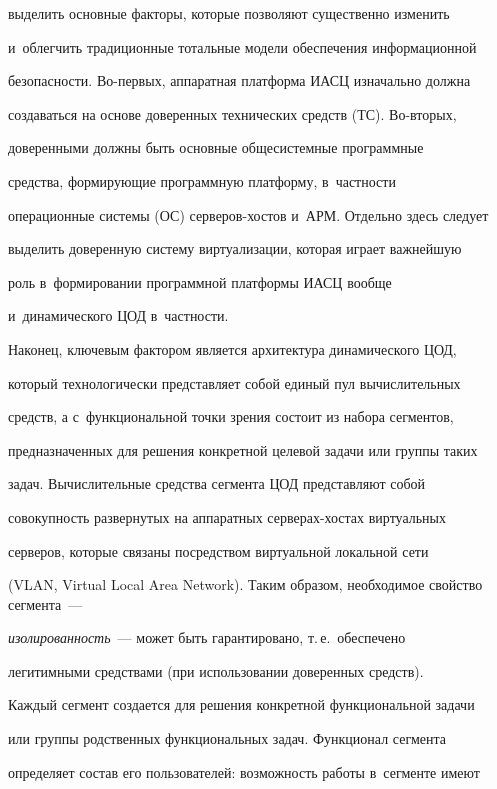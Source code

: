 выделить основные факторы, которые позволяют существенно изменить 


и~облегчить традиционные тотальные модели обеспечения информационной 


безопасности. Во-пер\-вых, аппаратная платформа ИАСЦ изначально должна 


создаваться на основе доверенных технических средств (ТС). Во-вторых, 


доверенными должны быть основные общесистемные программные 


средства, формирующие программную платформу, в~част\-ности 


операционные системы (ОС) сер\-ве\-ров-хос\-тов и~АРМ. Отдельно здесь следует 


выделить доверенную систему виртуализации, которая играет важнейшую 


роль в~формировании программной платформы ИАСЦ вообще 


и~динамического ЦОД в~част\-ности.





Наконец, ключевым фактором является архитектура динамического ЦОД, 


который технологически представляет собой единый пул вычислительных 


средств, а с~функциональной точки зрения состоит из набора сегментов, 


предназначенных для решения конкретной целевой задачи или группы таких 


задач. Вычислительные средства сегмента ЦОД представляют собой 


совокупность развернутых на аппаратных сер\-ве\-рах-хос\-тах виртуальных 


серверов, которые связаны посредством виртуальной локальной сети 


(VLAN, Virtual Local Area Network). Таким образом, необходимое свойство сегмента~--- 


\textit{изолированность}~--- может быть гарантировано, т.\,е.\ обеспечено 


легитимными средствами (при использовании доверенных средств).





Каждый сегмент создается для решения конкретной функциональной задачи 


или группы родственных функциональных задач. Функционал сегмента 


определяет состав его пользователей: возможность работы в~сегменте имеют 


